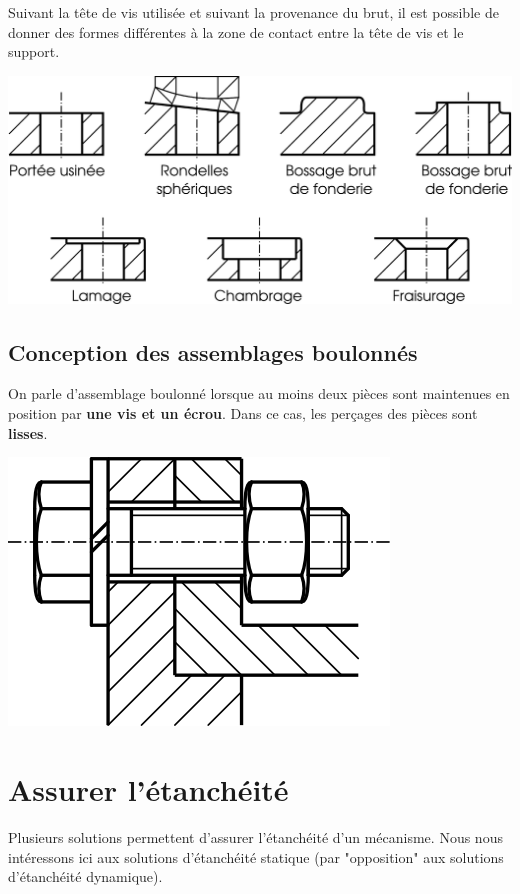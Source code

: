 \documentclass[11pt,oneside]{article}
\begin{document}
\vspace{.5cm}

Suivant la tête de vis utilisée et suivant la provenance du brut, il est possible de donner des formes différentes à la zone de contact entre la tête de vis et le support. 

\begin{center}
\includegraphics[width=.7\textwidth]{png/portees}
\end{center}



\subsection{Conception des assemblages boulonnés}

On parle d'assemblage boulonné lorsque au moins deux pièces sont maintenues en position par \textbf{une vis et un écrou}. Dans ce cas, les perçages des pièces sont \textbf{lisses}.

\begin{center}
\includegraphics[width=.3\textwidth]{png/Fig30_7}

\end{center}





\section{Assurer l'étanchéité}
Plusieurs solutions permettent d'assurer l'étanchéité d'un mécanisme. Nous nous intéressons ici aux solutions d'étanchéité statique (par "opposition" aux solutions d'étanchéité dynamique).
\end{document}
